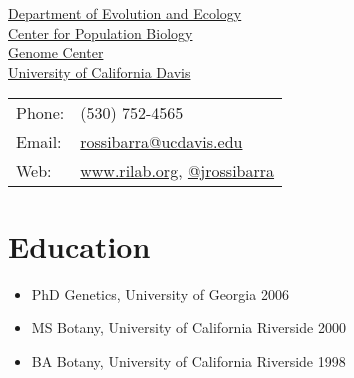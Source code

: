 {\huge \name}


\vspace{0.25in}

\begin{minipage}{0.55\linewidth}
  \href{http://eve.ucdavis.edu}{Department of Evolution and Ecology}\\
  \href{http://cpb.ucdavis.edu/}{Center for Population Biology}\\
  \href{http://www.genomecenter.ucdavis.edu/}{Genome Center}\\
  \href{http://www.ucdavis.edu/}{University of California Davis} \\
\end{minipage}
\begin{minipage}{0.35\linewidth}
  \begin{tabular}{ll}
    Phone: & (530) 752-4565 \\
    Email: & \href{mailto:rossibarra@ucdavis.edu}{rossibarra@ucdavis.edu} \\
    Web: & \href{http://www.rilab.org/}{www.rilab.org}, \href{http://www.twitter.com/jrossibarra/}{@jrossibarra} \\
  \end{tabular}
\end{minipage}

\section*{Education}
\begin{itemize}
\setlength\itemsep{0ex}
 \item PhD Genetics, University of Georgia 2006
  \item MS Botany, University of California Riverside 2000
 \item BA Botany, University of California Riverside 1998
\end{itemize}

